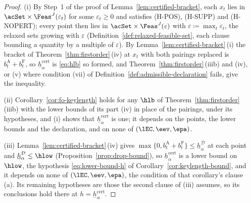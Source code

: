 \begin{proof}
(i) By Step~1 of the proof of Lemma~\ref{lem:certified-bracket}, each $x_t$
lies in $\acSet\times\Feas^{J}(\varepsilon_t)$ for some $\varepsilon_t\ge0$
and satisfies (H-POS), (H-SUPP) and (H-NOPERT); every point then lies in
$\acSet\times\Feas^{J}(\varepsilon)$ with $\varepsilon\coloneqq
\max_t\varepsilon_t$, the relaxed sets growing with $\varepsilon$
(Definition~\ref{def:relaxed-feasible-set}, each clause bounding a quantity
by a multiple of $\varepsilon$). By Lemma~\ref{lem:certified-bracket}\,(i)
the bracket of Theorem~\ref{thm:firstorder}\,(iv) at $x_t$ with both
pairings replaced is $b^{\mathrm A}_t+b^{\mathrm F}_t$, so
$\underline{h}^{\mathrm{cert}}_{\alpha}$ is \eqref{eq:hlb} so formed, and
Theorem~\ref{thm:firstorder}\,(iiib) and (iv), or (v) where condition (vii)
of Definition~\ref{def:admissible-declaration} fails, give the inequality.

(ii) Corollary~\ref{cor:fo-keylength} holds for any $\hlb$ of
Theorem~\ref{thm:firstorder}\,(iiib) with the lower bounds of its part (iv)
in place of the pairings, under its hypotheses, and (i) shows that
$\underline{h}^{\mathrm{cert}}_{\alpha}$ is one; it depends on the points,
the lower bounds and the declaration, and on none of
$(\lEC,\eev,\epa)$.

(iii) Lemma~\ref{lem:certified-bracket}\,(iv) gives
$\max\{0,b^{\mathrm A}_t+b^{\mathrm F}_t\}\le
\underline{h}^{\mathcal{D}}_{\alpha}$ at each point and
$\underline{h}^{\mathcal{D}}_{\alpha}\le\hlow$
(Proposition~\ref{prop:drop-bound}), so
$\underline{h}^{\mathrm{cert}}_{\alpha}$ is a lower bound on $\hlow$, the
hypothesis \eqref{eq:lower-bound-h} of
Corollary~\ref{cor:keylength-bound}, and it depends on none of
$(\lEC,\eev,\epa)$, the condition of that corollary's clause (a). Its
remaining hypotheses are those the second clause of (iii) assumes, so its
conclusions hold there at $h=\underline{h}^{\mathrm{cert}}_{\alpha}$.
\end{proof}
